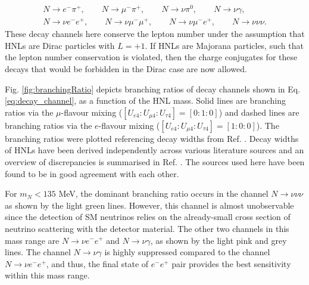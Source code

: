 \begin{equation}
\begin{split}
\label{eq:decay_channel}
	N\rightarrow e^{-}\pi^{+},\qquad 
	N\rightarrow \mu^{-}\pi^{+},\qquad
	N\rightarrow \nu \pi^{0},\qquad 
	N\rightarrow \nu \gamma,\qquad \\ 
	N\rightarrow \nu e^{-} e^{+},\qquad 
	N\rightarrow \nu \mu^{-} \mu^{+},\qquad 
	N\rightarrow \nu \mu^{-}e^{+},\qquad
	N\rightarrow \nu \nu \nu.   
\end{split}
\end{equation}
These decay channels here conserve the lepton number under the assumption that HNLs are Dirac particles with $L=+1$.
If HNLs are Majorana particles, such that the lepton number conservation is violated, then the charge conjugates for these decays that would be forbidden in the Dirac case are now allowed.


Fig. \ref{fig:branchingRatio} depicts branching ratios of decay channels shown in Eq. \ref{eq:decay_channel}, as a function of the HNL mass.
Solid lines are branching ratios via the $\mu$-flavour mixing ($[U_{e4}:U_{\mu4}:U_{\tau4}]=[0:1:0]$) and dashed lines are branching ratios via the $e$-flavour mixing ($[U_{e4}:U_{\mu4}:U_{\tau4}]=[1:0:0]$).
The branching ratios were plotted referencing decay widths from Ref. \cite {HNLBin, SBNHNL, HNLZarko}.
Decay widths of HNLs have been derived independently across various literature sources and an overview of discrepancies is summarised in Ref. \cite{HNLZarko}. 
The sources used here have been found to be in good agreement with each other.

For $m_{N} < 135$ MeV, the dominant branching ratio occurs in the channel $N\rightarrow \nu\nu\nu$ as shown by the light green lines.
However, this channel is almost unobservable since the detection of SM neutrinos relies on the already-small cross section of neutrino scattering with the detector material.
The other two channels in this mass range are $N\rightarrow \nu e^{-}e^{+}$ and $N\rightarrow \nu \gamma$, as shown by the light pink and grey lines.
The channel $N\rightarrow \nu \gamma$ is highly suppressed compared to the channel $N\rightarrow \nu e^{-}e^{+}$, and thus, the final state of $e^-e^+$ pair provides the best sensitivity within this mass range.

